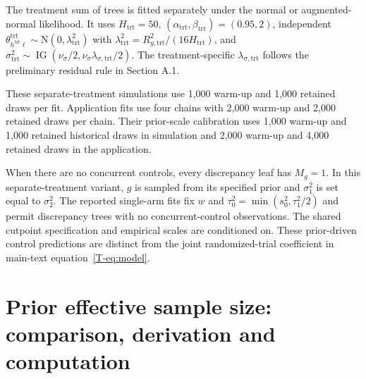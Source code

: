 \documentclass[11pt]{article}
\newcommand{\N}{\mathrm{N}}
\newcommand{\IG}{\operatorname{IG}}
\theoremstyle{remark}\newtheorem{remark}{Remark}[section]
\providecommand{\DIFaddtex}[1]{{\protect\color{blue} \sf #1}} %
\providecommand{\DIFaddbegin}{} %
\providecommand{\DIFaddend}{} %
\providecommand{\DIFadd}[1]{\texorpdfstring{\DIFaddtex{#1}}{#1}} %
\begin{document}
\DIFadd{The treatment sum of trees is fitted separately under the normal or augmented-normal likelihood. It uses $H_{\mathrm{trt}}=50$, $(\alpha_{\mathrm{trt}},\beta_{\mathrm{trt}})=(0.95,2)$, independent $\theta^{\mathrm{trt}}_{h^{\mathrm{trt}}\ell}\sim\N(0,\lambda_{\mathrm{trt}}^2)$ with $\lambda_{\mathrm{trt}}^2=R_{y,\mathrm{trt}}^2/(16H_{\mathrm{trt}})$, and $\sigma_{\mathrm{trt}}^2\sim\IG(\nu_\sigma/2,\nu_\sigma\lambda_{\sigma,\mathrm{trt}}/2)$. The treatment-specific $\lambda_{\sigma,\mathrm{trt}}$ follows the preliminary residual rule in Section A.1}\DIFaddend .


\DIFaddbegin \DIFadd{These separate-treatment simulations use 1,000 warm-up and 1,000 retained draws per fit. Application fits use four chains with 2,000 warm-up and 2,000 retained draws per chain. Their prior-scale calibration uses 1,000 warm-up and 1,000 retained historical draws in simulation and 2,000 warm-up and 4,000 retained draws in the application.
}

\DIFaddend When there are no  \DIFaddbegin \DIFadd{concurrent }\DIFaddend controls, every  \DIFaddbegin \DIFadd{discrepancy }\DIFaddend leaf has $M_g=1$.  \DIFaddbegin \DIFadd{In this separate-treatment variant, }\DIFaddend $g$  \DIFaddbegin \DIFadd{is sampled from its specified prior and $\sigma_1^2$ is set equal to $\sigma_2^2$. The reported single-arm fits fix $w$ and $\tau_0^2=\min(s_0^2,\tau_1^2/2)$ and permit discrepancy trees with no concurrent-control observations. }\DIFaddend The shared cutpoint specification and  \DIFaddbegin \DIFadd{empirical scales are conditioned on. These }\DIFaddend prior-driven  \DIFaddbegin \DIFadd{control predictions are distinct from the joint randomized-trial coefficient in main-text equation~\eqref{T-eq:model}}\DIFaddend .
 \section{Prior effective sample size: comparison, derivation and computation}\label{sec:B}
\end{document}
